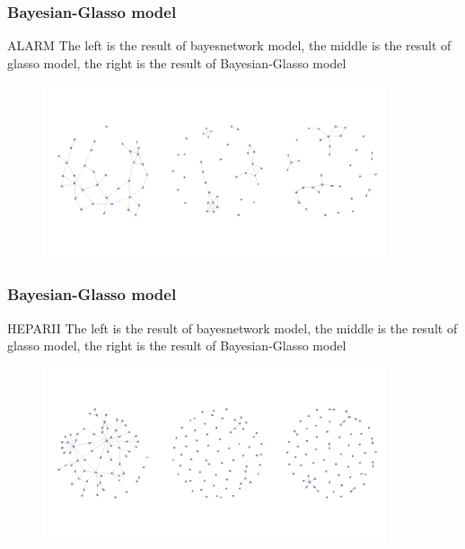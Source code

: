 \documentclass{beamer}
\begin{document}
\begin{frame}
\frametitle{Bayesian-Glasso model}
  \begin{block}{ALARM}
  The left is the result of bayesnetwork model, the middle is the result of glasso model, the right is the result of Bayesian-Glasso model
 \begin{center}
 \begin{figure}
     \includegraphics[width=0.9\textwidth, height=0.7\textheight]{alarm.jpeg}

    \end{figure}
\end{center}
  \end{block}


\end{frame}

\begin{frame}
\frametitle{Bayesian-Glasso model}
  \begin{block}{HEPARII}
  The left is the result of bayesnetwork model, the middle is the result of glasso model, the right is the result of Bayesian-Glasso model
 \begin{center}
 \begin{figure}
     \includegraphics[width=0.9\textwidth, height=0.7\textheight]{hepar2.jpeg}

    \end{figure}
\end{center}
  \end{block}


\end{frame}
\end{document}
